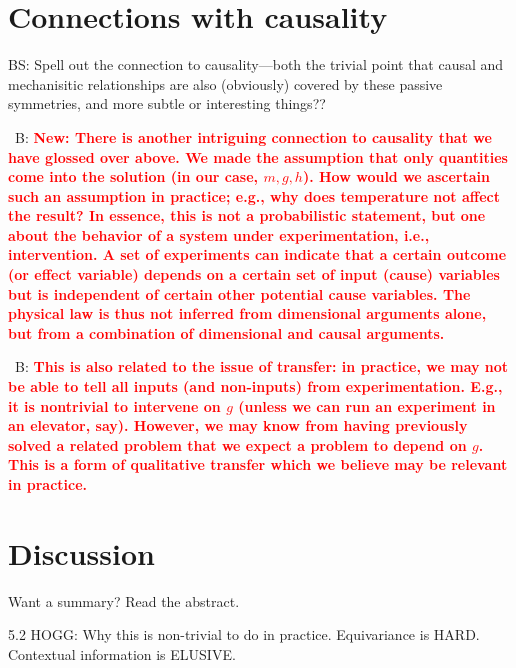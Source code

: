 \documentclass{article}
\theoremstyle{plain}
\theoremstyle{definition}
\theoremstyle{remark}
\newcommand{\bernhard}[1]{~B: \textcolor{red}{\textbf{#1}}}
\begin{document}
\section{Connections with causality}\label{sec:causality}

BS: Spell out the connection to causality---both the trivial point that causal and mechanisitic relationships are also (obviously) covered by these passive symmetries, and more subtle or interesting things??

\bernhard{New: There is another intriguing connection to causality that we have glossed over above.
We made the assumption that only quantities come into the solution (in our case, $m, g, h$). How would we ascertain such an assumption in practice; e.g., why does temperature not affect the result? In essence, this is not a probabilistic statement, but one about the behavior of a system under experimentation, i.e., intervention. A set of experiments can indicate that a certain outcome (or effect variable) depends on a certain set of input (cause) variables but is independent of certain other potential cause variables. The physical law is thus not inferred from dimensional arguments alone, but from a combination of dimensional and causal arguments.}

\bernhard{This is also related to the issue of transfer: in practice, we may not be able to tell all inputs (and non-inputs) from experimentation. E.g., it is nontrivial to intervene on $g$ (unless we can run an experiment in an elevator, say). However, we may know from having previously solved a related problem that we expect a problem to depend on $g$. This is a form of qualitative transfer which we believe may be relevant in practice.}

\section{Discussion}\label{sec:summary}

Want a summary? Read the abstract.

   5.2 HOGG: Why this is non-trivial to do in practice. Equivariance is HARD. Contextual information is ELUSIVE.

\end{document}
